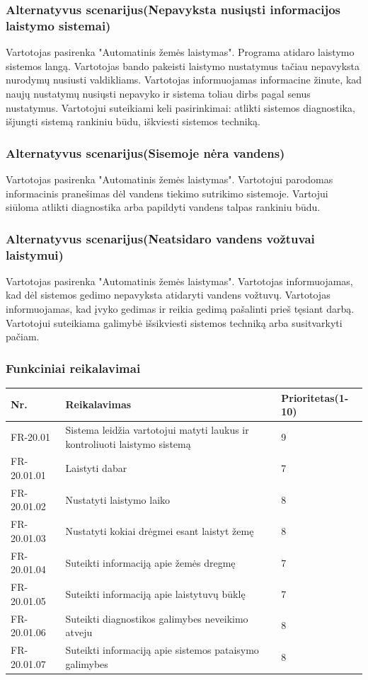 \documentclass[oneside]{VUMIFPSkursinis}
\begin{document}
	\subsubsection{Alternatyvus scenarijus(Nepavyksta nusiųsti informacijos laistymo sistemai)}
	Vartotojas pasirenka "Automatinis žemės laistymas". Programa atidaro laistymo sistemos langą. Vartotojas bando pakeisti laistymo nustatymus tačiau nepavyksta nurodymų nusiusti valdikliams. Vartotojas informuojamas informacine žinute, kad naujų nustatymų nusiųsti nepavyko ir sistema toliau dirbs pagal senus nustatymus. Vartotojui suteikiami keli pasirinkimai: atlikti sistemos diagnostika, išjungti 	sistemą rankiniu būdu, iškviesti sistemos techniką.
	\subsubsection{Alternatyvus scenarijus(Sisemoje nėra vandens)}
	Vartotojas pasirenka "Automatinis žemės laistymas". Vartotojui parodomas informacinis pranešimas dėl vandens tiekimo sutrikimo sistemoje. Vartojui siūloma atlikti diagnostika arba papildyti vandens talpas rankiniu būdu.
	\subsubsection{Alternatyvus scenarijus(Neatsidaro vandens vožtuvai laistymui)}
	Vartotojas pasirenka "Automatinis žemės laistymas". Vartotojas informuojamas, kad dėl sistemos gedimo nepavyksta atidaryti vandens vožtuvų. Vartotojas informuojamas, kad įvyko gedimas ir reikia gedimą pašalinti prieš tęsiant darbą. Vartotojui suteikiama galimybė išsikviesti sistemos techniką arba susitvarkyti pačiam.
	\subsubsection{Funkciniai reikalavimai}
\begin{table}[htbp]
	\begin{tabularx}{1\textwidth}{ |P{2.5cm}|X|P{3cm }| } \hline
		Nr. & Reikalavimas & Prioritetas(1-10) \\ \hline
		FR-20.01 & Sistema leidžia vartotojui matyti laukus ir kontroliuoti laistymo sistemą & 9 \\ \hline
		FR-20.01.01 & Laistyti dabar & 7 \\ \hline
		FR-20.01.02 & Nustatyti laistymo laiko & 8\\ \hline
		FR-20.01.03 & Nustatyti kokiai drėgmei esant laistyt žemę & 8 \\ \hline
		FR-20.01.04 & Suteikti informaciją apie žemės dregmę & 7 \\ \hline
		FR-20.01.05 & Suteikti informaciją apie laistytuvų būklę & 7 \\ \hline
		FR-20.01.06 & Suteikti diagnostikos galimybes neveikimo atveju & 8 \\ \hline
		FR-20.01.07 & Suteikti informaciją apie sistemos pataisymo galimybes & 8 \\ \hline
	\end{tabularx}
\end{table}
\end{document}
